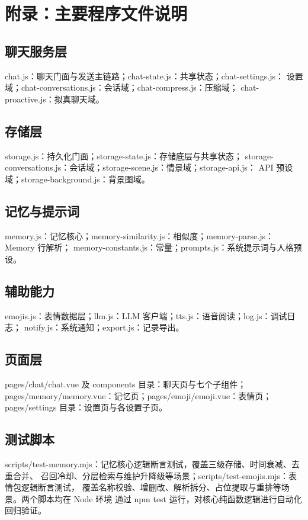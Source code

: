 \documentclass[zihao=5,a4paper]{ctexart}
\begin{document}
\section{附录：主要程序文件说明}
\sloppy

\subsection{聊天服务层}
chat.js：聊天门面与发送主链路；chat-state.js：共享状态；chat-settings.js：
设置域；chat-conversations.js：会话域；chat-compress.js：压缩域；
chat-proactive.js：拟真聊天域。

\subsection{存储层}
storage.js：持久化门面；storage-state.js：存储底层与共享状态；
storage-conversations.js：会话域；storage-scene.js：情景域；storage-api.js：
API 预设域；storage-background.js：背景图域。

\subsection{记忆与提示词}
memory.js：记忆核心；memory-similarity.js：相似度；memory-parse.js：Memory 行解析；
memory-constants.js：常量；prompts.js：系统提示词与人格预设。

\subsection{辅助能力}
emojis.js：表情数据层；llm.js：LLM 客户端；tts.js：语音阅读；log.js：调试日志；
notify.js：系统通知；export.js：记录导出。

\subsection{页面层}
pages/chat/chat.vue 及 components 目录：聊天页与七个子组件；
pages/memory/memory.vue：记忆页；pages/emoji/emoji.vue：表情页；
pages/settings 目录：设置页与各设置子页。

\subsection{测试脚本}
scripts/test-memory.mjs：记忆核心逻辑断言测试，覆盖三级存储、时间衰减、去重合并、
召回冷却、分层检索与维护升降级等场景；scripts/test-emojis.mjs：表情包逻辑断言测试，
覆盖名称校验、增删改、解析拆分、占位提取与重排等场景。两个脚本均在 Node 环境
通过 npm test 运行，对核心纯函数逻辑进行自动化回归验证。
\end{document}
